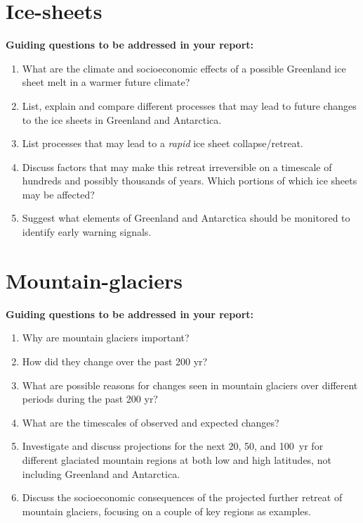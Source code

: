 \documentclass[12pt]{article}
\begin{document}
\section*{Ice-sheets}
  \textbf{Guiding questions to be addressed in your report:}
    \begin{enumerate}
    \item What are the climate and socioeconomic effects of a possible Greenland ice sheet melt in a warmer future climate?
    \item List, explain and compare different processes that may lead to future changes to the ice sheets in Greenland and Antarctica.
    \item List processes that may lead to a {\textit{rapid}} ice sheet collapse/retreat.
    \item Discuss factors that may make this retreat irreversible on a timescale of hundreds and possibly thousands of years. Which portions of which ice sheets may be affected?
    \item Suggest what elements of Greenland and Antarctica should be monitored to identify early warning signals.
    \end{enumerate}

\section*{Mountain-glaciers}
  \textbf{Guiding questions to be addressed in your report:}
    \begin{enumerate}
    \item Why are mountain glaciers important?
    \item How did they change over the past 200 yr?
    \item What are possible reasons for changes seen in mountain glaciers over different periods during the past 200 yr?
    \item What are the timescales of observed and expected changes?
    \item Investigate and discuss projections for the next 20, 50, and 100~yr for different glaciated mountain regions at both low and high latitudes, not including Greenland and Antarctica.
    \item Discuss the socioeconomic consequences of the projected further retreat of mountain glaciers, focusing on a couple of key regions as examples.
    \end{enumerate}
\end{document}

